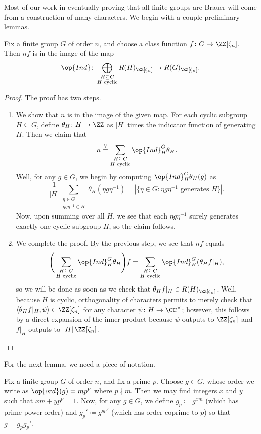 \documentclass[../thesis.tex]{subfiles}
\begin{document}
Most of our work in eventually proving that all finite groups are Brauer will come from a construction of many characters. We begin with a couple preliminary lemmas.
\begin{lemma} \label{lem:divisible-char-is-induced}
	Fix a finite group $G$ of order $n$, and choose a class function $f\colon G\to\ZZ[\zeta_n]$. Then $nf$ is in the image of the map
	\[\op{Ind}\colon\bigoplus_{\substack{H\subseteq G\\H\text{ cyclic}}}R(H)_{\ZZ[\zeta_n]}\to R(G)_{\ZZ[\zeta_n]}.\]
\end{lemma}
\begin{proof}
	The proof has two steps.
	\begin{enumerate}
		\item We show that $n$ is in the image of the given map. For each cyclic subgroup $H\subseteq G$, define $\theta_H\colon H\to\ZZ$ as $\left|H\right|$ times the indicator function of generating $H$. Then we claim that
		\[n\stackrel?=\sum_{\substack{H\subseteq G\\H\text{ cyclic}}}\op{Ind}_H^G\theta_H.\]
		Well, for any $g\in G$, we begin by computing $\op{Ind}_H^G\theta_H(g)$ as
		\[\frac1{\left|H\right|}\sum_{\substack{\eta\in G\\\eta g\eta^{-1}\in H}}\theta_H\left(\eta g\eta^{-1}\right)=\left|\{\eta\in G:\eta g\eta^{-1}\text{ generates }H\}\right|.\]
		Now, upon summing over all $H$, we see that each $\eta g\eta^{-1}$ surely generates exactly one cyclic subgroup $H$, so the claim follows.
		\item We complete the proof. By the previous step, we see that $nf$ equals
		\[\Bigg(\sum_{\substack{H\subseteq G\\H\text{ cyclic}}}\op{Ind}_H^G\theta_H\Bigg)f=\sum_{\substack{H\subseteq G\\H\text{ cyclic}}}\op{Ind}_H^G(\theta_Hf|_H),\]
		so we will be done as soon as we check that $\theta_Hf|_H\in R(H)_{\ZZ[\zeta_n]}$. Well, because $H$ is cyclic, orthogonality of characters permits to merely check that $\langle\theta_Hf|_H,\psi\rangle\in\ZZ[\zeta_n]$ for any character $\psi\colon H\to\CC^\times$; however, this follows by a direct expansion of the inner product because $\psi$ outputs to $\ZZ[\zeta_n]$ and $f|_H$ outputs to $\left|H\right|\ZZ[\zeta_n]$.
		\qedhere
	\end{enumerate}
\end{proof}
For the next lemma, we need a piece of notation.
\begin{notation}
	Fix a finite group $G$ of order $n$, and fix a prime $p$. Choose $g\in G$, whose order we write as $\op{ord}(g)=mp^\nu$ where $p\nmid m$. Then we may find integers $x$ and $y$ such that $xm+yp^\nu=1$. Now, for any $g\in G$, we define $g_p\coloneqq g^{xm}$ (which has prime-power order) and $g_p'\coloneqq g^{yp^\nu}$ (which has order coprime to $p$) so that $g=g_pg_p'$.
\end{notation}
\end{document}
